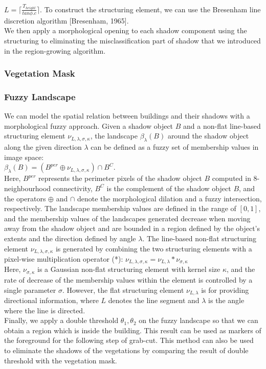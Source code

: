 \documentclass[runningheads]{llncs}
\newcommand{\insertTwoF}[5]{
  \begin{figure}[h!]
    \centering
    \begin{minipage}{#4\linewidth}
    \texttt{[image: \#1]}
    \end{minipage}
    \begin{minipage}{#4\linewidth}
    \texttt{[image: \#2]}
    \end{minipage}
      \caption{#3}
      \label{#5}
  \end{figure}  
}
\newcommand{\insertF}[4]{
  \begin{figure}[h!]
    \centering
    \begin{minipage}{#3\linewidth}
    \texttt{[image: \#1]}
    \end{minipage}  
      \caption{#2}
      \label{#4}
  \end{figure}  
}
\begin{document}
$L=\lceil \frac{T_{height}}{tan \phi.c}\rceil$.
To construct the structuring element, we can use the Bresenham line discretion algorithm [Bresenham, 1965].\\
We then apply a morphological opening to each shadow component using the structuring to eliminating the misclassification part of shadow that we introduced in the region-growing algorithm.\\


\subsubsection{Vegetation Mask}
\subsubsection{Fuzzy Landscape}
We can model the spatial relation between buildings and their
shadows with a morphological fuzzy approach. Given a
shadow object $B$ and a non-flat line-based structuring element
$\nu_{L,\lambda,\sigma,\kappa}$, the landscape $\beta_{\lambda}(B)$ around the shadow object along the
given direction $\lambda$ can be defined as a fuzzy set of membership values in image space: \\
 $\beta_{\lambda}(B)=(B^{per}\oplus \nu_{L,\lambda,\sigma,\kappa})\cap B^C$. \\
Here, $B^{per}$ represents the perimeter pixels of the shadow object $B$ computed in 8-neighbourhood connectivity, $B^C$ is the complement of the shadow object $B$, and the operators $\oplus$ and $\cap$ denote the morphological dilation and a fuzzy intersection, respectively. The landscape membership values are defined in the range of $[0,1]$, and the membership values of the landscapes generated decrease when moving away from the shadow object and are bounded in a region defined by the object's extents and the direction defined by angle $\lambda$. The line-based non-flat
structuring element $\nu_{L,\lambda,\sigma,\kappa}$ is generated by combining the two structuring elements with a pixel-wise multiplication operator (*):
$\nu_{L,\lambda,\sigma,\kappa}=\nu_{L,\lambda}*\nu_{\sigma,\kappa}$ \\
Here, $\nu_{\sigma,\kappa}$ is a Gaussian non-flat structuring element with kernel size $\kappa$, and the rate of decrease of the membership values within the element is controlled by a single parameter $\sigma$. However, the flat
structuring element $\nu_{L,\lambda}$ is for providing directional information, where $L$ denotes the line segment and $\lambda$ is the angle where the line is directed.\\
Finally, we apply a double threshold $\theta_1, \theta_2$ on the fuzzy landscape so that we can obtain a region which is inside the building. This result can be used as markers of the foreground for the following step of grab-cut. This method can also be used to eliminate the shadows of the vegetations by comparing the result of double threshold with the vegetation mask.\\
 
\end{document}
